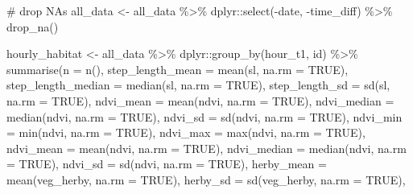 \documentclass[
  letterpaper,
  DIV=11,
  numbers=noendperiod]{scrartcl}
\newenvironment{Shaded}{\begin{snugshade}}{\end{snugshade}}
\newcommand{\AttributeTok}[1]{\textcolor[rgb]{0.40,0.45,0.13}{#1}}
\newcommand{\CommentTok}[1]{\textcolor[rgb]{0.37,0.37,0.37}{#1}}
\newcommand{\ConstantTok}[1]{\textcolor[rgb]{0.56,0.35,0.01}{#1}}
\newcommand{\FunctionTok}[1]{\textcolor[rgb]{0.28,0.35,0.67}{#1}}
\newcommand{\NormalTok}[1]{\textcolor[rgb]{0.00,0.23,0.31}{#1}}
\newcommand{\OtherTok}[1]{\textcolor[rgb]{0.00,0.23,0.31}{#1}}
\newcommand{\SpecialCharTok}[1]{\textcolor[rgb]{0.37,0.37,0.37}{#1}}
\begin{document}
\begin{Shaded}
\begin{Highlighting}[]
\CommentTok{\# drop NAs}
\NormalTok{all\_data }\OtherTok{\textless{}{-}}\NormalTok{ all\_data }\SpecialCharTok{\%\textgreater{}\%}\NormalTok{ dplyr}\SpecialCharTok{::}\FunctionTok{select}\NormalTok{(}\SpecialCharTok{{-}}\NormalTok{date, }\SpecialCharTok{{-}}\NormalTok{time\_diff) }\SpecialCharTok{\%\textgreater{}\%} \FunctionTok{drop\_na}\NormalTok{()}

\NormalTok{hourly\_habitat }\OtherTok{\textless{}{-}}
\NormalTok{  all\_data }\SpecialCharTok{\%\textgreater{}\%} 
\NormalTok{  dplyr}\SpecialCharTok{::}\FunctionTok{group\_by}\NormalTok{(hour\_t1, id) }\SpecialCharTok{\%\textgreater{}\%}
    \FunctionTok{summarise}\NormalTok{(}\AttributeTok{n =} \FunctionTok{n}\NormalTok{(),}
              \AttributeTok{step\_length\_mean =} \FunctionTok{mean}\NormalTok{(sl, }\AttributeTok{na.rm =} \ConstantTok{TRUE}\NormalTok{),}
              \AttributeTok{step\_length\_median =} \FunctionTok{median}\NormalTok{(sl, }\AttributeTok{na.rm =} \ConstantTok{TRUE}\NormalTok{),}
              \AttributeTok{step\_length\_sd =} \FunctionTok{sd}\NormalTok{(sl, }\AttributeTok{na.rm =} \ConstantTok{TRUE}\NormalTok{),}
              \AttributeTok{ndvi\_mean =} \FunctionTok{mean}\NormalTok{(ndvi, }\AttributeTok{na.rm =} \ConstantTok{TRUE}\NormalTok{),}
              \AttributeTok{ndvi\_median =} \FunctionTok{median}\NormalTok{(ndvi, }\AttributeTok{na.rm =} \ConstantTok{TRUE}\NormalTok{),}
              \AttributeTok{ndvi\_sd =} \FunctionTok{sd}\NormalTok{(ndvi, }\AttributeTok{na.rm =} \ConstantTok{TRUE}\NormalTok{),}
              \AttributeTok{ndvi\_min =} \FunctionTok{min}\NormalTok{(ndvi, }\AttributeTok{na.rm =} \ConstantTok{TRUE}\NormalTok{),}
              \AttributeTok{ndvi\_max =} \FunctionTok{max}\NormalTok{(ndvi, }\AttributeTok{na.rm =} \ConstantTok{TRUE}\NormalTok{),}
              \AttributeTok{ndvi\_mean =} \FunctionTok{mean}\NormalTok{(ndvi, }\AttributeTok{na.rm =} \ConstantTok{TRUE}\NormalTok{),}
              \AttributeTok{ndvi\_median =} \FunctionTok{median}\NormalTok{(ndvi, }\AttributeTok{na.rm =} \ConstantTok{TRUE}\NormalTok{),}
              \AttributeTok{ndvi\_sd =} \FunctionTok{sd}\NormalTok{(ndvi, }\AttributeTok{na.rm =} \ConstantTok{TRUE}\NormalTok{),}
              \AttributeTok{herby\_mean =} \FunctionTok{mean}\NormalTok{(veg\_herby, }\AttributeTok{na.rm =} \ConstantTok{TRUE}\NormalTok{),}
              \AttributeTok{herby\_sd =} \FunctionTok{sd}\NormalTok{(veg\_herby, }\AttributeTok{na.rm =} \ConstantTok{TRUE}\NormalTok{),}

\end{Highlighting}
\end{Shaded}
\end{document}
